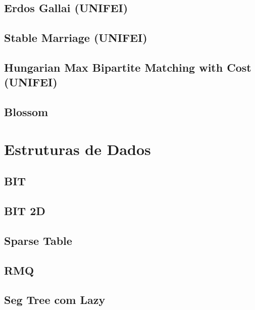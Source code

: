 \subsection{Erdos Gallai (UNIFEI)}
\raggedbottom
\hrulefill
\subsection{Stable Marriage (UNIFEI)}
\raggedbottom
\hrulefill
\subsection{Hungarian Max Bipartite Matching with Cost (UNIFEI)}
\raggedbottom
\hrulefill
\subsection{Blossom}
\raggedbottom
\hrulefill

\section{Estruturas de Dados}
\subsection{BIT}
\raggedbottom
\hrulefill
\subsection{BIT 2D}
\raggedbottom
\hrulefill
\subsection{Sparse Table}
\raggedbottom
\hrulefill
\subsection{RMQ}
\raggedbottom
\hrulefill
\subsection{Seg Tree com Lazy}
\raggedbottom
\hrulefill
